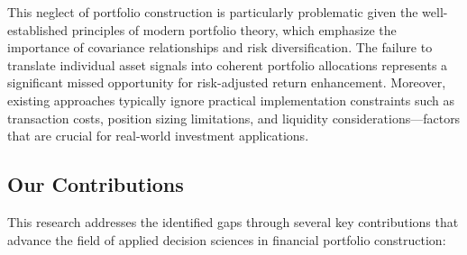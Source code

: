\documentclass{singlecol-new}
\theoremstyle{TH}{
\newtheorem{lemma}{Lemma}
\newtheorem{theorem}[lemma]{Theorem}
\newtheorem{corrolary}[lemma]{Corrolary}
\newtheorem{conjecture}[lemma]{Conjecture}
\newtheorem{proposition}[lemma]{Proposition}
\newtheorem{claim}[lemma]{Claim}
\newtheorem{stheorem}[lemma]{Wrong Theorem}
\newtheorem{algorithm}{Algorithm}
}
\theoremstyle{THrm}{
\newtheorem{definition}{Definition}[section]
\newtheorem{question}{Question}[section]
\newtheorem{remark}{Remark}
\newtheorem{scheme}{Scheme}
}
\theoremstyle{THhit}{
\newtheorem{case}{Case}[section]
}
\begin{document}
This neglect of portfolio construction is particularly problematic given the well-established principles of modern portfolio theory, which emphasize the importance of covariance relationships and risk diversification. The failure to translate individual asset signals into coherent portfolio allocations represents a significant missed opportunity for risk-adjusted return enhancement. Moreover, existing approaches typically ignore practical implementation constraints such as transaction costs, position sizing limitations, and liquidity considerations—factors that are crucial for real-world investment applications.



\subsection{Our Contributions}
This research addresses the identified gaps through several key contributions that advance the field of applied decision sciences in financial portfolio construction:
\end{document}
